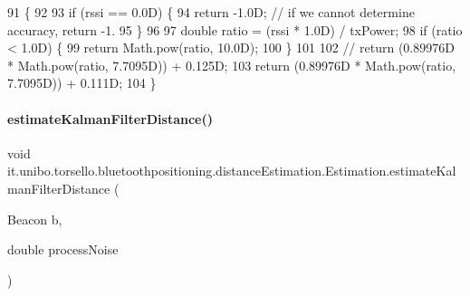 \begin{DoxyCode}
91                                                                   \{
92 
93         \textcolor{keywordflow}{if} (rssi == 0.0D) \{
94             \textcolor{keywordflow}{return} -1.0D; \textcolor{comment}{// if we cannot determine accuracy, return -1.}
95         \}
96 
97         \textcolor{keywordtype}{double} ratio = (rssi * 1.0D) / txPower;
98         \textcolor{keywordflow}{if} (ratio < 1.0D) \{
99             \textcolor{keywordflow}{return} Math.pow(ratio, 10.0D);
100         \}
101 
102 \textcolor{comment}{//        return (0.89976D * Math.pow(ratio, 7.7095D)) + 0.125D;}
103         \textcolor{keywordflow}{return} (0.89976D * Math.pow(ratio, 7.7095D)) + 0.111D;
104     \}
\end{DoxyCode}
\hypertarget{classit_1_1unibo_1_1torsello_1_1bluetoothpositioning_1_1distanceEstimation_1_1Estimation_ac3451825d5672d5e761269afc563e88e_ac3451825d5672d5e761269afc563e88e}{}\label{classit_1_1unibo_1_1torsello_1_1bluetoothpositioning_1_1distanceEstimation_1_1Estimation_ac3451825d5672d5e761269afc563e88e_ac3451825d5672d5e761269afc563e88e} 
\paragraph{\texorpdfstring{estimate\+Kalman\+Filter\+Distance()}{estimateKalmanFilterDistance()}}
{\footnotesize\ttfamily void it.\+unibo.\+torsello.\+bluetoothpositioning.\+distance\+Estimation.\+Estimation.\+estimate\+Kalman\+Filter\+Distance (\begin{DoxyParamCaption}\item[{Beacon}]{b,  }\item[{double}]{process\+Noise }\end{DoxyParamCaption})\hspace{0.3cm}{\ttfamily [private]}}


